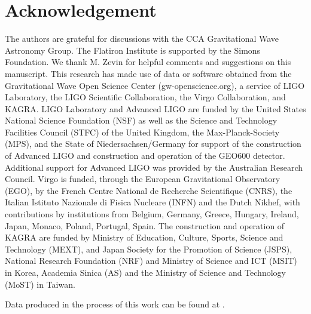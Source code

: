 \documentclass[linenumbers,twocolumn]{aastex631}
\begin{document}
\section{Acknowledgement}
The authors are grateful for discussions with the CCA Gravitational Wave Astronomy Group.
The Flatiron Institute is supported by the Simons Foundation.  We thank M. Zevin for helpful comments and suggestions on this manuscript.
This research has made use of data or software obtained from the Gravitational Wave Open Science Center (gw-openscience.org),
a service of LIGO Laboratory, the LIGO Scientific Collaboration, the Virgo Collaboration, and KAGRA.
LIGO Laboratory and Advanced LIGO are funded by the United States National Science Foundation (NSF) as well as
the Science and Technology Facilities Council (STFC) of the United Kingdom, the Max-Planck-Society (MPS),
and the State of Niedersachsen/Germany for support of the construction of Advanced LIGO and construction and operation of the GEO600 detector.
Additional support for Advanced LIGO was provided by the Australian Research Council. Virgo is funded, through the European Gravitational Observatory (EGO),
by the French Centre National de Recherche Scientifique (CNRS), the Italian Istituto Nazionale di Fisica Nucleare (INFN) and the Dutch Nikhef,
with contributions by institutions from Belgium, Germany, Greece, Hungary, Ireland, Japan, Monaco, Poland, Portugal, Spain.
The construction and operation of KAGRA are funded by Ministry of Education, Culture, Sports, Science and Technology (MEXT),
and Japan Society for the Promotion of Science (JSPS), National Research Foundation (NRF) and Ministry of Science and ICT (MSIT) in Korea,
Academia Sinica (AS) and the Ministry of Science and Technology (MoST) in Taiwan.

Data produced in the process of this work can be found at \cite{wong2022-data}.



\end{document}
